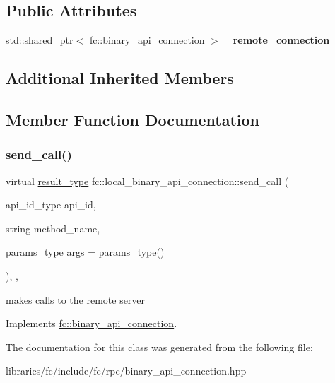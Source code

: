 \subsection*{Public Attributes}
\begin{DoxyCompactItemize}
\item 
\mbox{\label{classfc_1_1local__binary__api__connection_a5231c5c0d645de50f22bc7d237cb7d58}} 
std\+::shared\+\_\+ptr$<$ \mbox{\hyperlink{classfc_1_1binary__api__connection}{fc\+::binary\+\_\+api\+\_\+connection}} $>$ {\bfseries \+\_\+remote\+\_\+connection}
\end{DoxyCompactItemize}
\subsection*{Additional Inherited Members}


\subsection{Member Function Documentation}
\mbox{\label{classfc_1_1local__binary__api__connection_afe5ad41916d1118fcb24f14146df9485}} 
\subsubsection{\texorpdfstring{send\+\_\+call()}{send\_call()}}
{\footnotesize\ttfamily virtual \mbox{\hyperlink{classstd_1_1vector}{result\+\_\+type}} fc\+::local\+\_\+binary\+\_\+api\+\_\+connection\+::send\+\_\+call (\begin{DoxyParamCaption}\item[{api\+\_\+id\+\_\+type}]{api\+\_\+id,  }\item[{string}]{method\+\_\+name,  }\item[{\mbox{\hyperlink{classstd_1_1vector}{params\+\_\+type}}}]{args = {\ttfamily \mbox{\hyperlink{classstd_1_1vector}{params\+\_\+type}}()} }\end{DoxyParamCaption})\hspace{0.3cm}{\ttfamily [inline]}, {\ttfamily [override]}, {\ttfamily [virtual]}}

makes calls to the remote server 

Implements \mbox{\hyperlink{classfc_1_1binary__api__connection_af4db40adde5c6271df5163f5e3e7159f}{fc\+::binary\+\_\+api\+\_\+connection}}.



The documentation for this class was generated from the following file\+:\begin{DoxyCompactItemize}
\item 
libraries/fc/include/fc/rpc/binary\+\_\+api\+\_\+connection.\+hpp\end{DoxyCompactItemize}
